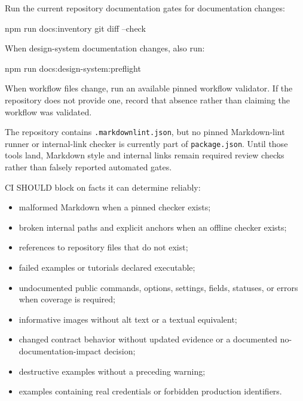 Run the current repository documentation gates for documentation changes:

\begin{CodeBlock}
npm run docs:inventory
git diff --check
\end{CodeBlock}

When design-system documentation changes, also run:

\begin{CodeBlock}
npm run docs:design-system:preflight
\end{CodeBlock}

When workflow files change, run an available pinned workflow validator. If the repository does not provide one, record that absence rather than claiming the workflow was validated.

The repository contains \texttt{.\allowbreak{}m\allowbreak{}a\allowbreak{}r\allowbreak{}k\allowbreak{}d\allowbreak{}o\allowbreak{}w\allowbreak{}n\allowbreak{}l\allowbreak{}i\allowbreak{}n\allowbreak{}t\allowbreak{}.\allowbreak{}j\allowbreak{}s\allowbreak{}o\allowbreak{}n}, but no pinned Markdown-lint runner or internal-link checker is currently part of \texttt{p\allowbreak{}a\allowbreak{}c\allowbreak{}k\allowbreak{}a\allowbreak{}g\allowbreak{}e\allowbreak{}.\allowbreak{}j\allowbreak{}s\allowbreak{}o\allowbreak{}n}. Until those tools land, Markdown style and internal links remain required review checks rather than falsely reported automated gates.

CI SHOULD block on facts it can determine reliably:

\begin{itemize}
\tightlist
\item
  malformed Markdown when a pinned checker exists;
\item
  broken internal paths and explicit anchors when an offline checker exists;
\item
  references to repository files that do not exist;
\item
  failed examples or tutorials declared executable;
\item
  undocumented public commands, options, settings, fields, statuses, or errors when coverage is required;
\item
  informative images without alt text or a textual equivalent;
\item
  changed contract behavior without updated evidence or a documented no-documentation-impact decision;
\item
  destructive examples without a preceding warning;
\item
  examples containing real credentials or forbidden production identifiers.
\end{itemize}

